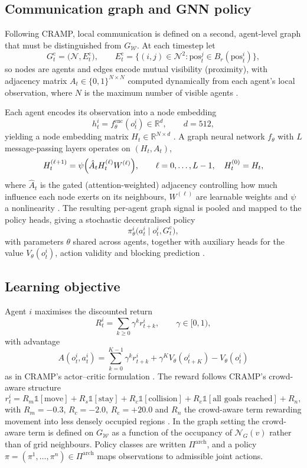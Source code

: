 \documentclass[../main.tex]{subfiles}
\begin{document}
\subsection{Communication graph and GNN policy}
Following CRAMP, local communication is defined on a second, agent-level graph
that must be distinguished from $G_{\mathcal{W}}$. At each timestep let
\[
  G^{\mathrm{c}}_t = \bigl( \mathcal{N}, E^{\mathrm{c}}_t \bigr),
  \qquad
  E^{\mathrm{c}}_t = \bigl\{ (i,j) \in \mathcal{N}^2 :
      \mathrm{pos}^j_t \in B_r(\mathrm{pos}^i_t) \bigr\},
\]
so nodes are agents and edges encode mutual visibility (proximity), with
adjacency matrix $A_t \in \{0,1\}^{N \times N}$ computed dynamically from each
agent's local observation, where $N$ is the maximum number of visible agents
\cite{cramp}.

Each agent encodes its observation into a node embedding
\[
  h^i_t = f^{\mathrm{enc}}_\theta ( o^i_t ) \in \mathbb{R}^{d}, \qquad d = 512,
\]
yielding a node embedding matrix $H_t \in \mathbb{R}^{N \times d}$
\cite{cramp}. A graph neural network $f_\theta$ with $L$ message-passing layers
operates on $(H_t, A_t)$,
\[
  H^{(\ell+1)}_t = \psi\Bigl( \hat{A}_t H^{(\ell)}_t W^{(\ell)} \Bigr),
  \qquad \ell = 0, \dots, L-1, \quad H^{(0)}_t = H_t ,
\]
where $\hat{A}_t$ is the gated (attention-weighted) adjacency controlling how
much influence each node exerts on its neighbours, $W^{(\ell)}$ are learnable
weights and $\psi$ a nonlinearity \cite{cramp}. The resulting per-agent graph
signal is pooled and mapped to the policy heads, giving a stochastic
decentralised policy
\[
  \pi^i_\theta \bigl( a^i_t \mid o^i_t, G^{\mathrm{c}}_t \bigr),
\]
with parameters $\theta$ shared across agents, together with auxiliary
heads for the value $V_\theta(o^i_t)$, action validity and blocking prediction
\cite{cramp}.

\subsection{Learning objective}
Agent $i$ maximises the discounted return
\[
  R^i_t = \sum_{k \ge 0} \gamma^k r^i_{t+k}, \qquad \gamma \in [0,1),
\]
with advantage
\[
  A(o^i_t, a^i_t) = \sum_{k=0}^{K-1} \gamma^k r^i_{t+k}
      + \gamma^K V_\theta(o^i_{t+K}) - V_\theta(o^i_t)
\]
as in CRAMP's actor--critic formulation \cite{cramp}. The reward follows
CRAMP's crowd-aware structure
\[
  r^i_t = R_m \mathbb{1}[\text{move}] + R_s \mathbb{1}[\text{stay}]
        + R_c \mathbb{1}[\text{collision}]
        + R_e \mathbb{1}[\text{all goals reached}] + R_n ,
\]
with $R_m = -0.3$, $R_c = -2.0$, $R_e = +20.0$ and $R_n$ the crowd-aware term
rewarding movement into less densely occupied regions \cite{cramp}. In the
graph setting the crowd-aware term is defined on $G_{\mathcal{W}}$ as a function
of the occupancy of $\mathcal{N}_G(v)$ rather than of grid neighbours.
Policy classes are written $\Pi^{\mathrm{arch}}$, and a policy
$\pi = (\pi^1, \dots, \pi^n) \in \Pi^{\mathrm{arch}}$ maps observations to
admissible joint actions.
\end{document}
